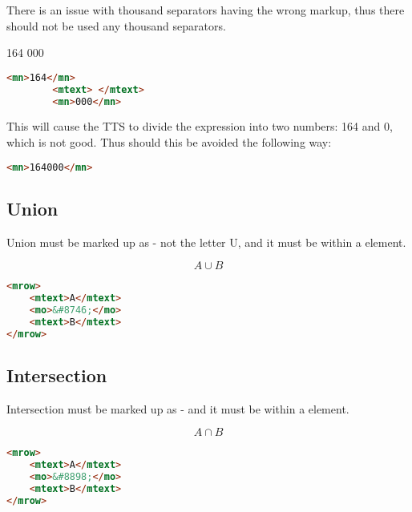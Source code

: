 \documentclass[english,a4paper,11pt]{article}
\begin{document}
There is an issue with thousand separators having the wrong markup, thus there should not be used any thousand separators.

\begin{examples}
	\textsc{164 000}
	\begin{lstlisting}[language=HTML, caption={\textbf{Invalid markup}}]
		<mn>164</mn>
		<mtext> </mtext>
		<mn>000</mn> 
	\end{lstlisting}
	
	This will cause the TTS to divide the expression into two numbers: 164 and 0, which is not good. Thus should this be avoided the following way:
	\begin{lstlisting}[language=HTML, caption={Valid markup}]
		<mn>164000</mn>
	\end{lstlisting}
\end{examples}

\subsection{Union}

Union must be marked up as  - not the letter U, and it must be within a  element. 

\begin{examples}
\begin{equation}
	A \cup B
\end{equation}
\begin{lstlisting}[language=HTML]
<mrow>
	<mtext>A</mtext>
	<mo>&#8746;</mo>
	<mtext>B</mtext>
</mrow>
\end{lstlisting}
\end{examples}

\subsection{Intersection}

Intersection must be marked up as  - and it must be within a  element. 

\begin{examples}
\begin{equation}
	A \cap B
\end{equation}
\begin{lstlisting}[language=HTML]
<mrow>
	<mtext>A</mtext>
	<mo>&#8898;</mo>
	<mtext>B</mtext>
</mrow>
\end{lstlisting}
\end{examples}
\end{document}
